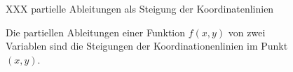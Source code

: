 %
%
%
\begin{figure}
\centering
\vspace*{2cm}
XXX partielle Ableitungen als Steigung der Koordinatenlinien
\vspace*{2cm}
\caption{Die partiellen Ableitungen einer Funktion $f(x,y)$ von
zwei Variablen sind die Steigungen der Koordinationenlinien im
Punkt $(x,y)$.
\label{buch:fuvar:richtungsableitung:fig:partabl}}
\end{figure}
